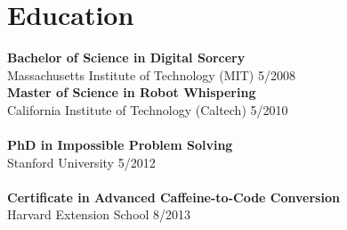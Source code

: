\documentclass[11pt]{article}
\begin{document}
\section*{\headingfont\color{headingcolor} Education}

\noindent\textbf{Bachelor of Science in Digital Sorcery} \\
Massachusetts Institute of Technology (MIT) \hfill 5/2008 
\\[0.5em]
\noindent\textbf{Master of Science in Robot Whispering} \\
California Institute of Technology (Caltech) \hfill 5/2010 \\
\\[0.5em]
\noindent\textbf{PhD in Impossible Problem Solving} \\
Stanford University \hfill 5/2012 \\
\\[0.5em]
\noindent\textbf{Certificate in Advanced Caffeine-to-Code Conversion} \\
Harvard Extension School \hfill 8/2013 \\
\end{document}

